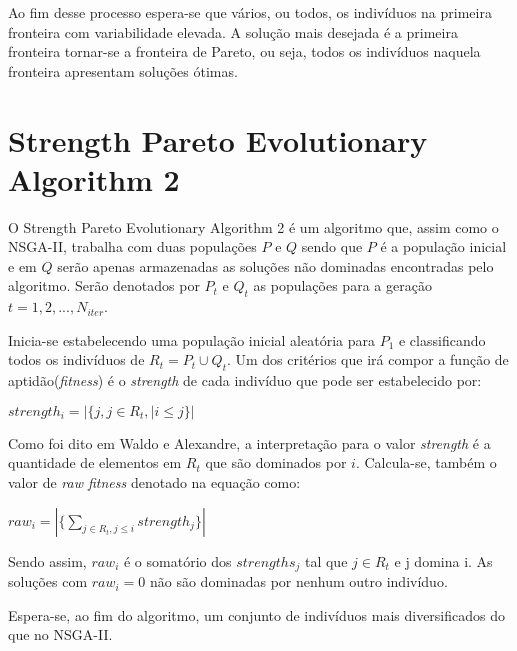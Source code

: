 \documentclass[12pt, %
openright, 
oneside, %
a4paper,    %
brazil]{facom-ufu-abntex2}
\begin{document}
   Ao fim desse processo espera-se que vários, ou todos, os indivíduos na primeira fronteira com variabilidade elevada. A solução mais desejada é a primeira fronteira tornar-se a fronteira de Pareto, ou seja, todos os indivíduos naquela fronteira apresentam soluções ótimas.
 
\section{Strength Pareto Evolutionary Algorithm 2}
	O Strength Pareto Evolutionary Algorithm 2\cite{SPEA2} é um algoritmo que, assim como o NSGA-II, trabalha com duas populações $P$ e $Q$ sendo que $P$ é a população inicial e em $Q$ serão apenas armazenadas as soluções não dominadas encontradas pelo algoritmo. Serão denotados por $P_t$ e $Q_t$ as populações para a geração $t = 1, 2, ..., N_{iter}$.
    
    Inicia-se estabelecendo uma população inicial aleatória para $P_1$ e classificando todos os indivíduos de $R_t = P_t \cup Q_t$. Um dos critérios que irá compor a função de aptidão(\textit{fitness}) é o \textit{strength} de cada indivíduo que pode ser estabelecido por:
 
 \begin{large}
 \begin{center}
  	 $strength_i = |\{j,j \in R_t, | i \leq j\}|$
  \end{center}
 \end{large}
  
   Como foi dito em Waldo e Alexandre, \cite{WaldoAlexandre} a interpretação para o valor  \textit{strength} é a quantidade de elementos em $R_t$ que são dominados por $i$. Calcula-se, também o valor de \textit{raw fitness} denotado na equação como:
   
\begin{large}
 \begin{center}
  	 $raw_i = |\{\sum_{j \in R_t, j\leq i} strength_j\}|$
  \end{center}
\end{large}
   
    Sendo assim,  $raw_i$ é o somatório dos $strengths_j$ tal que $j \in R_t$ e j domina i. As soluções com $raw_i = 0$ não são dominadas por nenhum outro indivíduo.  
    
    Espera-se, ao fim do algoritmo, um conjunto de indivíduos mais diversificados do que no NSGA-II.
	
    

\end{document}
